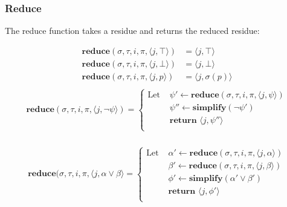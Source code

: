 \documentclass[10pt,a4paper]{article}
\newcommand{\rp}[2]{\ensuremath{\langle #1, #2 \rangle}}
\begin{document}
\subsubsection*{Reduce}
The reduce function takes a residue and returns the reduced residue:


\begin{align*}
\mathbf{reduce}(\sigma,\tau, i,\pi,\rp{j}{\top}) &= \rp{j}{\top} \\
\mathbf{reduce}(\sigma,\tau, i,\pi,\rp{j}{\bot}) &= \rp{j}{\bot} \\
\mathbf{reduce}(\sigma,\tau, i,\pi,\rp{j}{p}) &= \rp{j}{\sigma(p)} \\
\end{align*}
\begin{align*}
\mathbf{reduce}(\sigma,\tau, i,\pi,\rp{j}{\neg \psi}) = \left\{
\begin{aligned}
\text{Let } &\psi' \leftarrow \mathbf{reduce}(\sigma, \tau, i, \pi, \rp{j}{\psi}) \\
&\psi'' \leftarrow \mathbf{simplify}(\neg \psi') \\
&\textbf{return } \rp{j}{\psi''} \\
\end{aligned} \right. \\
\end{align*}

\begin{align*}
\mathbf{reduce}(\sigma,\tau, i,\pi,\rp{j}{\alpha \vee \beta} = \left\{
\begin{aligned}
\text{Let } &\alpha' \leftarrow \mathbf{reduce}(\sigma, \tau, i, \pi, \rp{j}{\alpha}) \\
&\beta' \leftarrow \mathbf{reduce}(\sigma, \tau, i, \pi, \rp{j}{\beta}) \\
&\phi' \leftarrow \mathbf{simplify}(\alpha' \vee \beta') \\
&\textbf{return } \rp{j}{\phi'} \\
\end{aligned} \right. \\
\end{align*}
\end{document}
